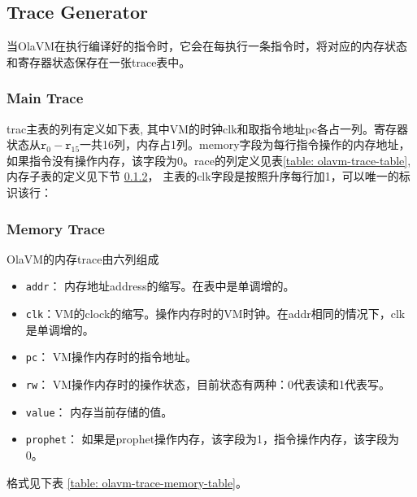 \subsection{Trace Generator}\label{subsec: : trace-generator}
当OlaVM在执行编译好的指令时，它会在每执行一条指令时，将对应的内存状态和寄存器状态保存在一张trace表中。
\subsubsection{Main Trace}\label{subsubsec: olavm-main-trace}
trac主表的列有定义如下表, 其中VM的时钟clk和取指令地址pc各占一列。寄存器状态从$\texttt{r}_0 - \texttt{r}_{15}$一共16列，内存占1列。memory字段为每行指令操作的内存地址，如果指令没有操作内存，该字段为0。race的列定义见表\ref{table: olavm-trace-table},内存子表的定义见下节 \ref{subsubsec: olavm-trace-memory}，
主表的clk字段是按照升序每行加1，可以唯一的标识该行：
\begin{table}[!ht]
    \centering {}
    \caption{OlaVM的trace表结构}
    \label{table: olavm-trace-table}
\end{table}

\subsubsection{Memory Trace}\label{subsubsec: olavm-trace-memory}
OlaVM的内存trace由六列组成
\begin{itemize}
    \item \verb|addr|： 内存地址address的缩写。在表中是单调增的。
    \item \verb|clk|：VM的clock的缩写。操作内存时的VM时钟。在addr相同的情况下，clk是单调增的。
    \item \verb|pc|： VM操作内存时的指令地址。
    \item \verb|rw|： VM操作内存时的操作状态，目前状态有两种：0代表读和1代表写。
    \item \verb|value|： 内存当前存储的值。
    \item \verb|prophet|： 如果是prophet操作内存，该字段为1，指令操作内存，该字段为0。
\end{itemize}

格式见下表 \ref{table: olavm-trace-memory-table}。


